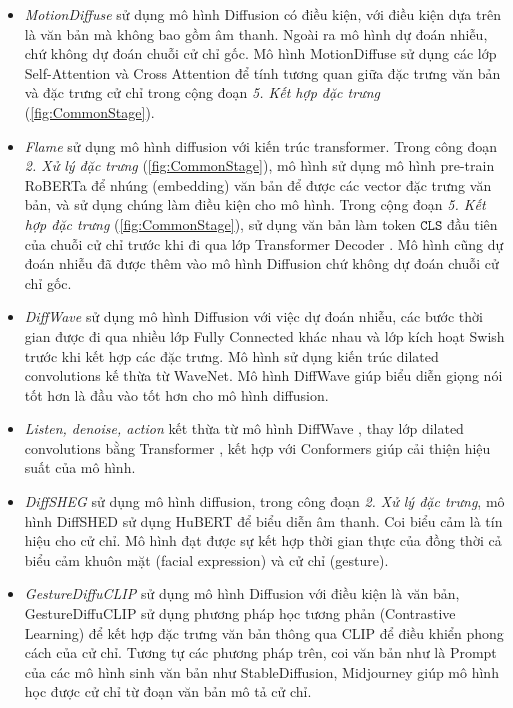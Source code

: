 \begin{itemize}
	\item \textit{MotionDiffuse} \cite{zhang2022motiondiffuse} sử dụng mô hình Diffusion có điều kiện, với điều kiện dựa trên là văn bản mà không bao gồm âm thanh. Ngoài ra mô hình dự đoán nhiễu, chứ không dự đoán chuỗi cử chỉ gốc. Mô hình MotionDiffuse sử dụng các lớp Self-Attention và Cross Attention để tính tương quan giữa đặc trưng văn bản và đặc trưng cử chỉ trong cộng đoạn \textit{5. Kết hợp đặc trưng} (\autoref{fig:CommonStage}).
	
	\item \textit{Flame} \cite{kim2023flame} sử dụng mô hình diffusion với kiến trúc transformer. Trong công đoạn \textit{2. Xử lý đặc trưng} (\autoref{fig:CommonStage}), mô hình sử dụng mô hình pre-train RoBERTa để nhúng (embedding) văn bản để được các vector đặc trưng văn bản, và sử dụng chúng làm điều kiện cho mô hình. 
	Trong cộng đoạn \textit{5. Kết hợp đặc trưng} (\autoref{fig:CommonStage}), sử dụng văn bản làm token $\texttt{CLS}$ đầu tiên của chuỗi cử chỉ trước khi đi qua lớp Transformer Decoder .  Mô hình cũng dự đoán nhiễu đã được thêm vào mô hình Diffusion chứ không dự đoán chuỗi cử chỉ gốc.
	
	\item \textit{DiffWave} \cite{kong2020diffwave} sử dụng mô hình Diffusion với việc dự đoán nhiễu, các bước thời gian được đi qua nhiều lớp Fully Connected khác nhau và lớp kích hoạt Swish trước khi kết hợp các đặc trưng. Mô hình sử dụng kiến trúc dilated convolutions kế thừa từ WaveNet. Mô hình DiffWave giúp biểu diễn giọng nói tốt hơn là đầu vào tốt hơn cho mô hình diffusion.
	
	\item \textit{Listen, denoise, action} \cite{alexanderson2022listen} kết thừa từ mô hình DiffWave \cite{kong2020diffwave}, thay lớp dilated convolutions bằng Transformer , kết hợp với Conformers giúp cải thiện hiệu suất của mô hình.
	
	\item \textit{DiffSHEG} \cite{chen2024diffsheg} sử dụng mô hình diffusion, trong công đoạn \textit{2. Xử lý đặc trưng}, mô hình DiffSHED sử dụng HuBERT để biểu diễn âm thanh. Coi biểu cảm là tín hiệu cho cử chỉ. Mô hình đạt được sự kết hợp thời gian thực của đồng thời cả biểu cảm khuôn mặt (facial expression) và cử chỉ (gesture).
	
	\item \textit{GestureDiffuCLIP} \cite{ao2023gesturediffuclip} sử dụng mô hình Diffusion với điều kiện là văn bản, GestureDiffuCLIP sử dụng phương pháp học tương phản (Contrastive Learning) để kết hợp đặc trưng văn bản thông qua CLIP để điều khiển phong cách của cử chỉ. Tương tự các phương pháp trên, coi văn bản như là Prompt của các mô hình sinh văn bản như StableDiffusion, Midjourney giúp mô hình học được cử chỉ từ đoạn văn bản mô tả cử chỉ.
	

\end{itemize}
